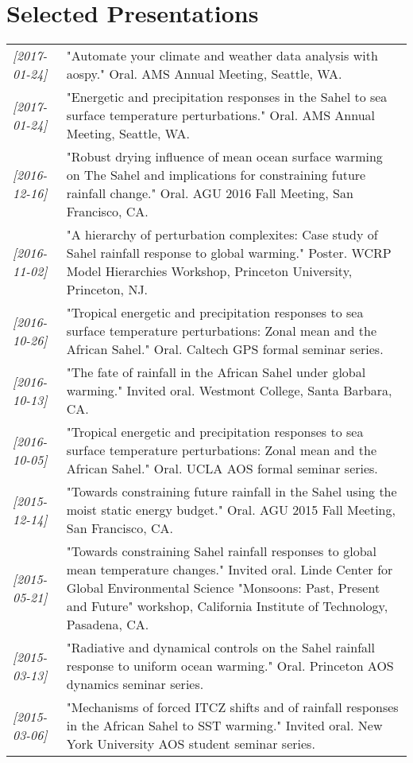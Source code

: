 \documentclass[12pt,letterpaper]{shillcv}
\begin{document}
\section*{Selected Presentations}
\label{sec:org592d586}
\begin{center}
\begin{tabularx}{\textwidth}{lX}
\textit{[2017-01-24]} & "Automate your climate and weather data analysis with aospy."  Oral.  AMS Annual Meeting, Seattle, WA.\\
\textit{[2017-01-24]} & "Energetic and precipitation responses in the Sahel to sea surface temperature perturbations."  Oral.  AMS Annual Meeting, Seattle, WA.\\
\textit{[2016-12-16]} & "Robust drying influence of mean ocean surface warming on The Sahel and implications for constraining future rainfall change."  Oral.  AGU 2016 Fall Meeting, San Francisco, CA.\\
\textit{[2016-11-02]} & "A hierarchy of perturbation complexites: Case study of Sahel rainfall response to global warming."  Poster.  WCRP Model Hierarchies Workshop, Princeton University, Princeton, NJ.\\
\textit{[2016-10-26]} & "Tropical energetic and precipitation responses to sea surface temperature perturbations: Zonal mean and the African Sahel."  Oral.  Caltech GPS formal seminar series.\\
\textit{[2016-10-13]} & "The fate of rainfall in the African Sahel under global warming."  Invited oral.  Westmont College, Santa Barbara, CA.\\
\textit{[2016-10-05]} & "Tropical energetic and precipitation responses to sea surface temperature perturbations: Zonal mean and the African Sahel."  Oral.  UCLA AOS formal seminar series.\\
\textit{[2015-12-14]} & "Towards constraining future rainfall in the Sahel using the moist static energy budget." Oral.  AGU 2015 Fall Meeting, San Francisco, CA.\\
\textit{[2015-05-21]} & "Towards constraining Sahel rainfall responses to global mean temperature changes."  Invited oral.  Linde Center for Global Environmental Science "Monsoons: Past, Present and Future" workshop, California Institute of Technology, Pasadena, CA.\\
\textit{[2015-03-13]} & "Radiative and dynamical controls on the Sahel rainfall response to uniform ocean warming."  Oral.  Princeton AOS dynamics seminar series.\\
\textit{[2015-03-06]} & "Mechanisms of forced ITCZ shifts and of rainfall responses in the African Sahel to SST warming."  Invited oral.  New York University AOS student seminar series.\\

\end{tabularx}
\end{center}
\end{document}
